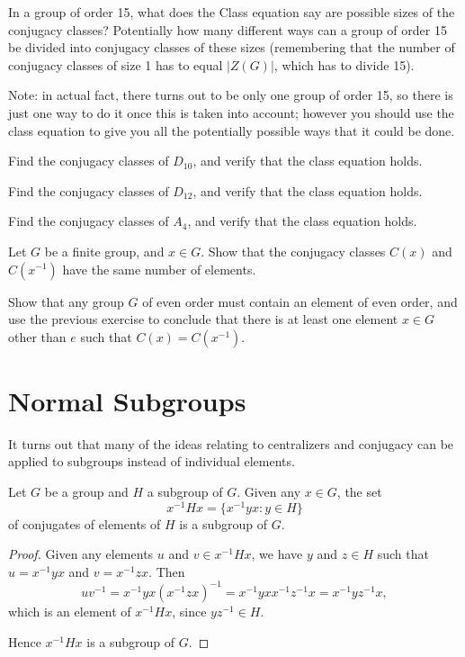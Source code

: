 \begin{exercises}
  \item In a group of order 15, what does the Class equation say are
  possible sizes of the conjugacy classes?  Potentially how many different
  ways can a group of order 15 be divided into conjugacy classes of these
  sizes (remembering that the number of conjugacy classes of size 1 has to
  equal $|Z(G)|$, which has to divide 15).
  
  Note: in actual fact, there turns out to be only one group of order 15,
  so there is just one way to do it once this is taken into account; however
  you should use the class equation to give you all the potentially possible
  ways that it could be done.
  
  \item Find the conjugacy classes of $D_{10}$, and verify that the 
  class equation holds.

  \item Find the conjugacy classes of $D_{12}$, and verify that the 
  class equation holds.

  \item Find the conjugacy classes of $A_{4}$, and verify that the 
  class equation holds.
  
  \item Let $G$ be a finite group, and $x \in G$.  Show that the
    conjugacy classes $C(x)$ and $C(x^{-1})$ have the same number of
    elements.
    
  \item Show that any group $G$ of even order must contain an
    element of even order, and use the previous exercise to conclude
    that there is at least one element $x \in G$ other than $e$ such
    that $C(x) = C(x^{-1})$.

\end{exercises}


\section{Normal Subgroups}

It turns out that many of the ideas relating to centralizers and conjugacy can
be applied to subgroups instead of individual elements.

\begin{proposition}
  Let $G$ be a group and $H$ a subgroup of $G$.  Given any $x \in G$, the
  set
  \[
    x^{-1}Hx = \{x^{-1}yx : y \in H \}
  \]
  of conjugates of elements of $H$ is a subgroup of $G$.
\end{proposition}
\begin{proof}
  Given any elements $u$ and $v \in x^{-1}Hx$, we have $y$ and $z \in H$
  such that $u = x^{-1}yx$ and $v = x^{-1}zx$.  Then
  \[
    uv^{-1} = x^{-1}yx(x^{-1}zx)^{-1} = x^{-1}yxx^{-1}z^{-1}x =
      x^{-1}yz^{-1}x,
  \]
  which is an element of $x^{-1}Hx$, since $yz^{-1} \in H$.
  
  Hence $x^{-1}Hx$ is a subgroup of $G$.
\end{proof}

